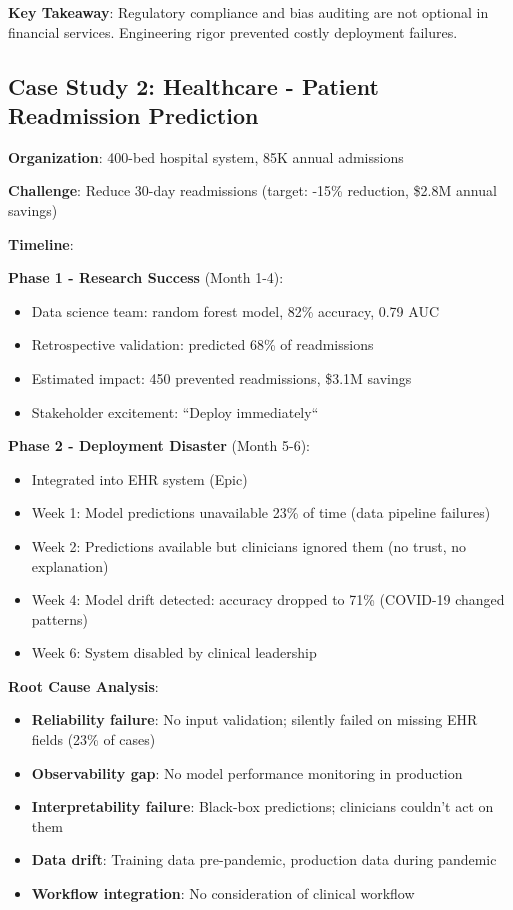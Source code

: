 \textbf{Key Takeaway}: Regulatory compliance and bias auditing are not optional in financial services. Engineering rigor prevented costly deployment failures.

\subsection{Case Study 2: Healthcare - Patient Readmission Prediction}

\textbf{Organization}: 400-bed hospital system, 85K annual admissions

\textbf{Challenge}: Reduce 30-day readmissions (target: -15\% reduction, \$2.8M annual savings)

\textbf{Timeline}:

\textbf{Phase 1 - Research Success} (Month 1-4):
\begin{itemize}
    \item Data science team: random forest model, 82\% accuracy, 0.79 AUC
    \item Retrospective validation: predicted 68\% of readmissions
    \item Estimated impact: 450 prevented readmissions, \$3.1M savings
    \item Stakeholder excitement: ``Deploy immediately``
\end{itemize}

\textbf{Phase 2 - Deployment Disaster} (Month 5-6):
\begin{itemize}
    \item Integrated into EHR system (Epic)
    \item Week 1: Model predictions unavailable 23\% of time (data pipeline failures)
    \item Week 2: Predictions available but clinicians ignored them (no trust, no explanation)
    \item Week 4: Model drift detected: accuracy dropped to 71\% (COVID-19 changed patterns)
    \item Week 6: System disabled by clinical leadership
\end{itemize}

\textbf{Root Cause Analysis}:
\begin{itemize}
    \item \textbf{Reliability failure}: No input validation; silently failed on missing EHR fields (23\% of cases)
    \item \textbf{Observability gap}: No model performance monitoring in production
    \item \textbf{Interpretability failure}: Black-box predictions; clinicians couldn't act on them
    \item \textbf{Data drift}: Training data pre-pandemic, production data during pandemic
    \item \textbf{Workflow integration}: No consideration of clinical workflow
\end{itemize}

